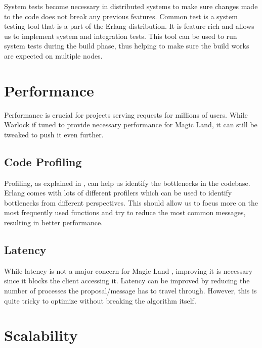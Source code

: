 System tests%
become necessary in distributed systems to make sure changes made to the code
does not break any previous features. Common test \citep{common.test} is a
system testing tool that is a part of the Erlang distribution. It is feature
rich and allows us to implement system and integration tests. This tool can
be used to run system tests during the build phase, thus helping to make sure
the build works are expected on multiple nodes.

\section{Performance}

Performance is crucial for projects serving requests for millions of users.
While Warlock if tuned to provide necessary performance for Magic Land, it
can still be tweaked to push it even further.

\subsection{Code Profiling}

Profiling, as explained in , can help us identify the
bottlenecks in the codebase. Erlang comes with lots of different profilers
which can be used to identify bottlenecks from different perspectives. This
should allow us to focus more on the most frequently used functions and try
to reduce the most common messages, resulting in better performance.

\subsection{Latency}

While latency is not a major concern for Magic Land%
, improving it is necessary since it blocks the client accessing it. Latency
can be improved by reducing the number of processes the proposal/message has
to travel through. However, this is quite tricky to optimize without breaking
the algorithm itself.

\section{Scalability}

